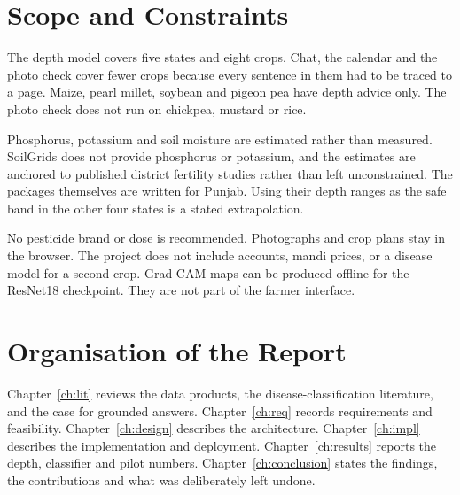 \section{Scope and Constraints}
The depth model covers five states and eight crops. Chat, the calendar and the photo check cover fewer crops because every sentence in them had to be traced to a page. Maize, pearl millet, soybean and pigeon pea have depth advice only. The photo check does not run on chickpea, mustard or rice.

Phosphorus, potassium and soil moisture are estimated rather than measured. SoilGrids does not provide phosphorus or potassium, and the estimates are anchored to published district fertility studies rather than left unconstrained. The packages themselves are written for Punjab. Using their depth ranges as the safe band in the other four states is a stated extrapolation.

No pesticide brand or dose is recommended. Photographs and crop plans stay in the browser. The project does not include accounts, mandi prices, or a disease model for a second crop. Grad-CAM maps \cite{selvaraju2017gradcam} can be produced offline for the ResNet18 checkpoint. They are not part of the farmer interface.

\section{Organisation of the Report}
Chapter~\ref{ch:lit} reviews the data products, the disease-classification literature, and the case for grounded answers. Chapter~\ref{ch:req} records requirements and feasibility. Chapter~\ref{ch:design} describes the architecture. Chapter~\ref{ch:impl} describes the implementation and deployment. Chapter~\ref{ch:results} reports the depth, classifier and pilot numbers. Chapter~\ref{ch:conclusion} states the findings, the contributions and what was deliberately left undone.
